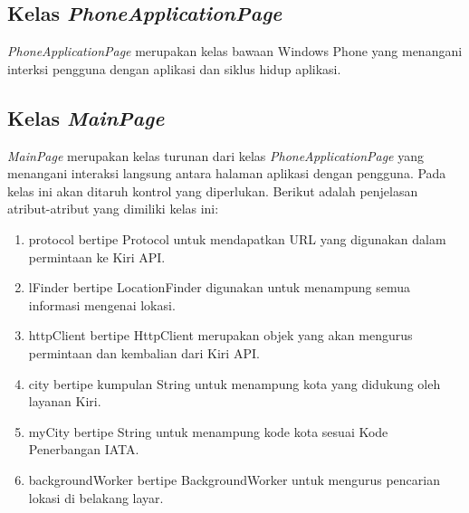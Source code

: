 \subsection{Kelas \textit{PhoneApplicationPage}}
\label{lab:Kelas PhoneApplicationPage}
\hspace{0.5cm} \textit{PhoneApplicationPage} merupakan kelas bawaan Windows Phone yang menangani interksi pengguna dengan aplikasi dan siklus hidup aplikasi.

\subsection{Kelas \textit{MainPage}}
\label{lab:Kelas MainPage}
\hspace{0.5cm} \textit{MainPage} merupakan kelas turunan dari kelas \textit{PhoneApplicationPage} yang menangani interaksi langsung antara halaman aplikasi dengan pengguna. Pada kelas ini akan ditaruh kontrol yang diperlukan. Berikut adalah penjelasan atribut-atribut yang dimiliki kelas ini:
\begin{enumerate}
	\item protocol bertipe Protocol untuk mendapatkan URL yang digunakan dalam permintaan ke Kiri API.
	\item lFinder bertipe LocationFinder digunakan untuk menampung semua informasi mengenai lokasi.
	\item httpClient bertipe HttpClient merupakan objek yang akan mengurus permintaan dan kembalian dari Kiri API.
	\item city bertipe kumpulan String untuk menampung kota yang didukung oleh layanan Kiri.
	\item myCity bertipe String untuk menampung kode kota sesuai Kode Penerbangan IATA.
	\item backgroundWorker bertipe BackgroundWorker untuk mengurus pencarian lokasi di belakang layar.
\end{enumerate}

